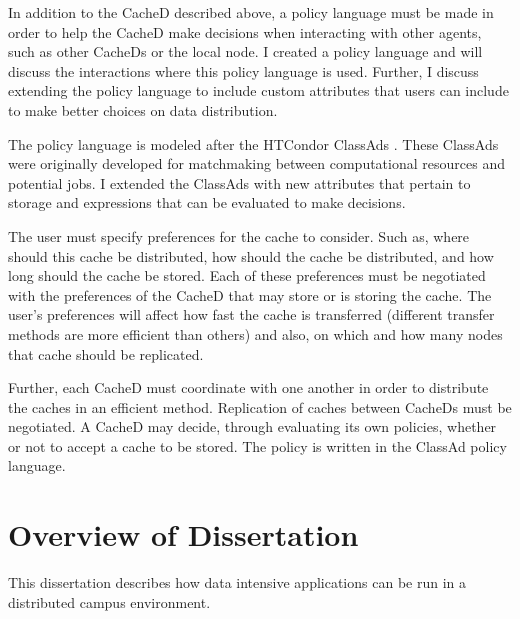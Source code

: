 In addition to the CacheD described above, a policy language must be made in order to help the CacheD make decisions when interacting with other agents, such as other CacheDs or the local node.  I created a policy language and will discuss the  interactions where this policy language is used.  Further, I discuss extending the policy language to include custom attributes that users can include to make better choices on data distribution.

The policy language is modeled after the HTCondor \mbox{ClassAds} \cite{raman1998matchmaking}.  These \mbox{ClassAds} were originally developed for matchmaking between computational resources and potential jobs.  I extended the ClassAds with new attributes that pertain to storage and expressions that can be evaluated to make decisions.

The user must specify preferences for the cache to consider.  Such as, where should this cache be distributed, how should the cache be distributed, and how long should the cache be stored.  Each of these preferences must be negotiated with the preferences of the CacheD that may store or is storing the cache.  The user's preferences will affect how fast the cache is transferred (different transfer methods are more efficient than others) and also, on which and how many nodes that cache should be replicated.

Further, each CacheD must coordinate with one another in order to distribute the caches in an efficient method.  Replication of caches between CacheDs must be negotiated.  A CacheD may decide, through evaluating its own policies, whether or not to accept a cache to be stored.  The policy is written in the ClassAd policy language.



\section{Overview of Dissertation}

This dissertation describes how data intensive applications can be run in a distributed campus environment.

